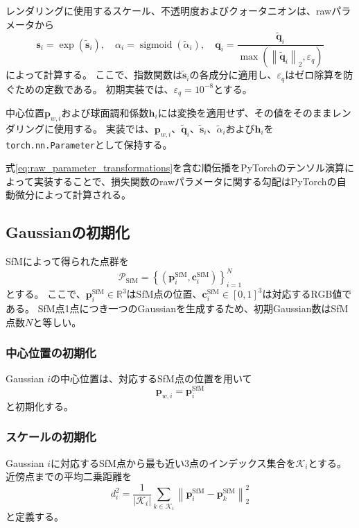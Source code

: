 \documentclass[dvipdfmx]{jlreq}
\begin{document}
レンダリングに使用するスケール、不透明度およびクォータニオンは、rawパラメータから
\begin{equation}
    \bm{s}_i = \exp\left(\widetilde{\bm{s}}_i\right), \quad \alpha_i = \operatorname{sigmoid} \left(\widetilde{\alpha}_i\right), \quad \bm{q}_i = \frac{\widetilde{\bm{q}}_i}{\max\left(\left\|\widetilde{\bm{q}}_i\right\|_2,\varepsilon_q\right)}
    \label{eq:raw_parameter_transformations}
\end{equation}
によって計算する。
ここで、指数関数は$\widetilde{\bm{s}}_i$の各成分に適用し、$\varepsilon_q$はゼロ除算を防ぐための定数である。
初期実装では、$\varepsilon_q=10^{-8}$とする。

中心位置$\bm{p}_{w,i}$および球面調和係数$\bm{h}_i$には変換を適用せず、その値をそのままレンダリングに使用する。
実装では、$\bm{p}_{w,i}$、$\widetilde{\bm{q}}_i$、$\widetilde{\bm{s}}_i$、$\widetilde{\alpha}_i$および$\bm{h}_i$を\texttt{torch.nn.Parameter}として保持する。

式\eqref{eq:raw_parameter_transformations}を含む順伝播をPyTorchのテンソル演算によって実装することで、損失関数のrawパラメータに関する勾配はPyTorchの自動微分によって計算される。

\subsection{Gaussianの初期化}
SfMによって得られた点群を
\begin{equation}
    \mathcal{P}_{\mathrm{SfM}} = \left\{\left(\bm{p}_i^{\mathrm{SfM}},\bm{c}_i^{\mathrm{SfM}}\right)\right\}_{i=1}^{N}
\end{equation}
とする。
ここで、$\bm{p}_i^{\mathrm{SfM}}\in\mathbb{R}^3$はSfM点の位置、$\bm{c}_i^{\mathrm{SfM}}\in[0,1]^3$は対応するRGB値である。
SfM点1点につき一つのGaussianを生成するため、初期Gaussian数はSfM点数$N$と等しい。

\subsubsection*{中心位置の初期化}
Gaussian $i$の中心位置は、対応するSfM点の位置を用いて
\begin{equation}
    \bm{p}_{w,i} = \bm{p}_i^{\mathrm{SfM}}
    \label{eq:implementation_position_initialization}
\end{equation}
と初期化する。

\subsubsection*{スケールの初期化}
Gaussian $i$に対応するSfM点から最も近い3点のインデックス集合を$\mathcal{K}_i$とする。
近傍点までの平均二乗距離を
\begin{equation}
    d_i^2 = \frac{1}{|\mathcal{K}_i|} \sum_{k\in\mathcal{K}_i} \left\|\bm{p}_i^{\mathrm{SfM}} -\bm{p}_k^{\mathrm{SfM}}\right\|_2^2
    \label{eq:initial_neighbor_distance}
\end{equation}
と定義する。
\end{document}
